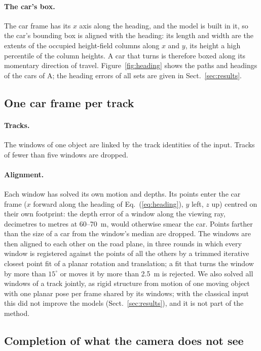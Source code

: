 \documentclass[runningheads,a4paper]{llncs}
\begin{document}
\paragraph{The car's box.} The car frame has its $x$ axis along the heading, and the model is built in it, so the car's
bounding box is aligned with the heading: its length and width are the extents of the occupied height-field columns
along $x$ and $y$, its height a high percentile of the column heights. A car that turns is therefore boxed along its
momentary direction of travel. Figure~\ref{fig:heading} shows the paths and headings of the cars of A; the heading
errors of all sets are given in Sect.~\ref{sec:results}.

\subsection{One car frame per track}\label{sec:fusion}

\paragraph{Tracks.} The windows of one object are linked by the track identities of the input. Tracks of fewer than
five windows are dropped.

\paragraph{Alignment.} Each window has solved its own motion and depths. Its points enter the car frame ($x$ forward
along the heading of Eq.~(\ref{eq:heading}), $y$ left, $z$ up) centred on their own footprint: the depth error of a
window along the viewing ray, decimetres to metres at 60--70~m, would otherwise smear the car. Points farther than
the size of a car from the window's median are dropped. The windows are then aligned to each other on the road
plane, in three rounds in which every window is registered against the points of all the others by a trimmed
iterative closest point fit \cite{icp} of a planar rotation and translation; a fit that turns the window by more
than $15^\circ$ or moves it by more than 2.5~m is rejected. We also solved all windows of a track jointly, as rigid
structure from motion of one moving object \cite{ozden2010} with one planar pose per frame shared by its windows;
with the classical input this did not improve the models (Sect.~\ref{sec:results}), and it is not part of the
method.

\subsection{Completion of what the camera does not see}\label{sec:completion}
\end{document}
